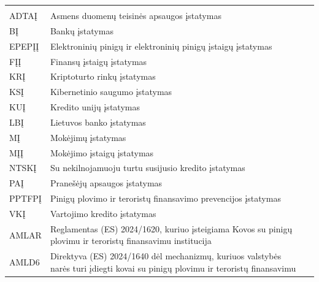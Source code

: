 \begin{xltabular}{\textwidth}{@{}L{20mm}YY@{}}
\toprule
{} &  &  \\
\midrule
\endfirsthead
\toprule
{} &  &  \\
\midrule
\endhead
\bottomrule
\endlastfoot
ADTAĮ & Asmens duomenų teisinės apsaugos įstatymas &  \\
BĮ & Bankų įstatymas &  \\
EPEPĮĮ & Elektroninių pinigų ir elektroninių pinigų įstaigų įstatymas &  \\
FĮĮ & Finansų įstaigų įstatymas &  \\
KRĮ & Kriptoturto rinkų įstatymas &  \\
KSĮ & Kibernetinio saugumo įstatymas &  \\
KUĮ & Kredito unijų įstatymas &  \\
LBĮ & Lietuvos banko įstatymas &  \\
MĮ & Mokėjimų įstatymas &  \\
MĮĮ & Mokėjimo įstaigų įstatymas &  \\
NTSKĮ & Su nekilnojamuoju turtu susijusio kredito įstatymas &  \\
PAĮ & Pranešėjų apsaugos įstatymas &  \\
PPTFPĮ & Pinigų plovimo ir teroristų finansavimo prevencijos įstatymas &  \\
VKĮ & Vartojimo kredito įstatymas &  \\
\midrule
AMLAR & Reglamentas (ES) 2024/1620, kuriuo įsteigiama Kovos su pinigų plovimu ir teroristų finansavimu institucija &  \\
AMLD6 & Direktyva (ES) 2024/1640 dėl mechanizmų, kuriuos valstybės narės turi įdiegti kovai su pinigų plovimu ir teroristų finansavimu &  \\

\end{xltabular}
